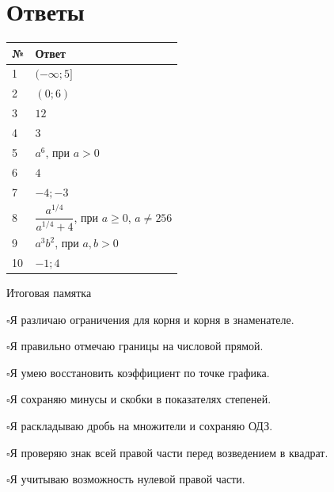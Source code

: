 \documentclass[a4paper,12pt]{article}
\newcommand{\checkitem}{\(\square\)\enspace}
\begin{document}
\section*{Ответы}
\begin{center}
\renewcommand{\arraystretch}{1.55}
\begin{tabularx}{\linewidth}{@{}lX@{}}
\toprule
№ & Ответ \\
\midrule
1 & $(-\infty;5]$ \\
2 & $(0;6)$ \\
3 & $12$ \\
4 & $3$ \\
5 & $a^6$, при $a>0$ \\
6 & $4$ \\
7 & $-4; -3$ \\
8 & $\dfrac{a^{1/4}}{a^{1/4}+4}$, при $a\ge0$, $a\ne256$ \\
9 & $a^3b^2$, при $a,b>0$ \\
10 & $-1; 4$ \\
\bottomrule
\end{tabularx}
\end{center}
\vspace{8mm}
\begin{center}{\large\color{darkaccent} Итоговая памятка}\end{center}
\checkitem Я различаю ограничения для корня и корня в знаменателе.\par
\checkitem Я правильно отмечаю границы на числовой прямой.\par
\checkitem Я умею восстановить коэффициент по точке графика.\par
\checkitem Я сохраняю минусы и скобки в показателях степеней.\par
\checkitem Я раскладываю дробь на множители и сохраняю ОДЗ.\par
\checkitem Я проверяю знак всей правой части перед возведением в квадрат.\par
\checkitem Я учитываю возможность нулевой правой части.\par
\end{document}
